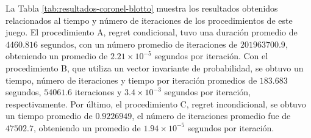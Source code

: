 La Tabla \ref{tab:resultados-coronel-blotto} muestra los resultados obtenidos relacionados al tiempo y número de iteraciones de los procedimientos de este juego. El procedimiento A, regret condicional, tuvo una duración promedio de $4460.816$ segundos, con un número promedio de iteraciones de $201963700.9$, obteniendo un promedio de $2.21 {\times} 10^{-5}$ segundos por iteración. Con el procedimiento B, que utiliza un vector invariante de probabilidad, se obtuvo un tiempo, número de iteraciones y tiempo por iteración promedios de $183.683$ segundos, $54061.6$ iteraciones y $3.4 {\times} 10^{-3}$ segundos por iteración, respectivamente. Por último, el procedimiento C, regret incondicional, se obtuvo un tiempo promedio de $0.9226949$, el número de iteraciones promedio fue de $47502.7$, obteniendo un promedio de $1.94 {\times} 10^{-5}$ segundos por iteración.

